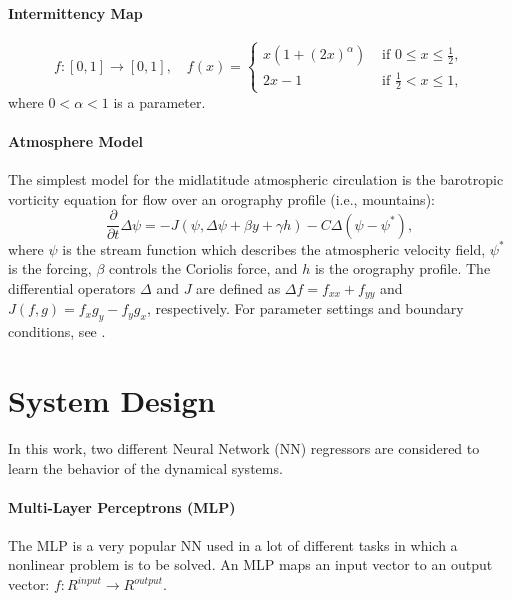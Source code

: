 \documentclass[a0, portrait]{IWIposter}
\begin{document}
\begin{multicols}{3}
\paragraph{Intermittency Map}

\begin{equation}
\label{intmap}
f : [0,1]\to[0,1], \quad
f(x) =
\begin{cases}
x(1+(2x)^\alpha) & \text{ if } 0 \leq x \leq \frac{1}{2}, \\
2x-1 & \text{ if } \tfrac{1}{2} < x \leq 1,
\end{cases}
\end{equation}
where $0 < \alpha < 1$ is a parameter. 

\paragraph{Atmosphere Model}
The simplest model for the midlatitude atmospheric circulation is the barotropic
vorticity equation for flow over an orography profile (i.e., mountains):
\begin{equation}\label{bve}
\frac{\partial}{\partial t}\Delta\psi
=
-J(\psi, \Delta\psi + \beta y + \gamma h) - C \Delta(\psi - \psi^*),
\end{equation}
where $\psi$ is the stream function which describes the atmospheric velocity
field, $\psi^*$ is the forcing, $\beta$ controls the Coriolis force, and $h$ is
the orography profile. The differential operators $\Delta$ and $J$ are defined
as $\Delta f = f_{xx} + f_{yy}$ and $J(f,g)=f_x g_y-f_y g_x$, respectively.
For parameter settings and boundary conditions, see
\cite{CrommelinOpsteeghVerhulst:04,SHRBV:2012}.


\section*{System Design}

In this work, two different Neural Network (NN) regressors are considered to learn the behavior of the dynamical systems.

\paragraph{Multi-Layer Perceptrons (MLP)}
The MLP is a very popular NN used in a lot of different tasks in which a nonlinear problem is to be solved. An MLP maps an input vector to an output vector: $f: R^{input} \rightarrow R^{output}$.


\end{multicols}
\end{document}

